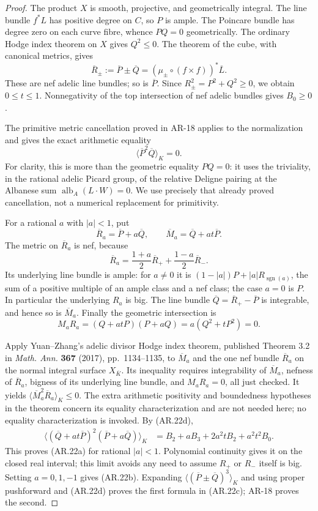 \begin{proof}
The product $X$ is smooth, projective, and geometrically integral.
The line bundle $f^*L$ has positive degree on $C$, so $P$ is ample.
The Poincare bundle has degree zero on each curve fibre, whence
$PQ=0$ geometrically.  The ordinary Hodge index theorem on $X$ gives
$Q^2\le0$.  The theorem of the cube, with canonical metrics, gives
\[
 \overline R_\pm:=\overline P\pm\overline Q
       =(\mu_\pm\circ(f\times f))^*\overline L.
\]
These are nef adelic line bundles; so is $\overline P$.  Since
$R_\pm^2=P^2+Q^2\ge0$, we obtain $0\le t\le1$.
Nonnegativity of the top intersection of nef adelic bundles gives
$B_0\ge0$.

The primitive metric cancellation proved in AR-18 applies to the
normalization and gives the exact arithmetic equality
\[
 \langle\overline P^2\overline Q\rangle_K=0.       \tag{AR.22d}
\]
For clarity, this is more than the geometric equality $PQ=0$: it
uses the triviality, in the rational adelic Picard group, of the
relative Deligne pairing at the Albanese sum
$\operatorname{alb}_A(L\cdot W)=0$.  We use precisely that already
proved cancellation, not a numerical replacement for primitivity.

For a rational $a$ with $|a|<1$, put
\[
 \overline R_a=\overline P+a\overline Q,
 \qquad \overline M_a=\overline Q+at\overline P.
\]
The metric on $\overline R_a$ is nef, because
\[
 \overline R_a=\frac{1+a}{2}\overline R_+
                    +\frac{1-a}{2}\overline R_-.
\]
Its underlying line bundle is ample: for $a\ne0$ it is
$(1-|a|)P+|a|R_{\operatorname{sgn}(a)}$, the sum of a positive
multiple of an ample class and a nef class; the case $a=0$ is $P$.
In particular the underlying $R_a$ is big.  The line bundle
$\overline Q=\overline R_+-\overline P$ is integrable, and hence
so is $\overline M_a$.  Finally the geometric intersection is
\[
 M_aR_a=(Q+atP)(P+aQ)=a(Q^2+tP^2)=0.
\]

Apply Yuan--Zhang's adelic divisor Hodge index theorem, published
Theorem 3.2 in \emph{Math. Ann.} \textbf{367} (2017), pp.~1134--1135,
to $\overline M_a$ and the one nef bundle $\overline R_a$ on the
normal integral surface $X_{\overline K}$.  Its inequality requires
integrability of $\overline M_a$, nefness of $\overline R_a$, bigness
of its underlying line bundle, and $M_aR_a=0$, all just checked.
It yields
$\langle\overline M_a^2\overline R_a\rangle_K\le0$.
The extra arithmetic positivity and boundedness hypotheses in the
theorem concern its equality characterization and are not needed
here; no equality characterization is invoked.  By (AR.22d),
\[
 \begin{split}
 \langle(\overline Q+at\overline P)^2
                     (\overline P+a\overline Q)\rangle_K
 &=B_2+aB_3+2a^2tB_2+a^2t^2B_0.
 \end{split}
\]
This proves (AR.22a) for rational $|a|<1$.  Polynomial continuity
gives it on the closed real interval; this limit avoids any need to
assume $R_+$ or $R_-$ itself is big.  Setting $a=0,1,-1$ gives
(AR.22b).  Expanding $\langle(\overline P\pm\overline Q)^3\rangle_K$
and using proper pushforward and (AR.22d) proves the first formula
in (AR.22c); AR-18 proves the second.
\end{proof}

